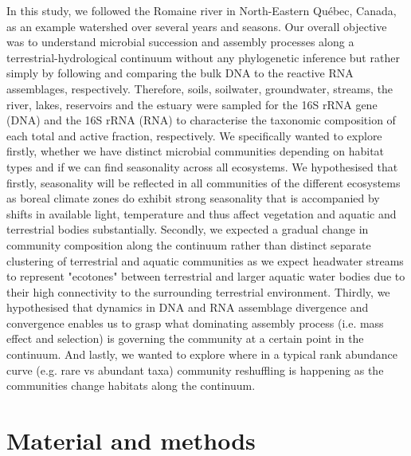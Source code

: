\documentclass[12pt,a4paper]{article} %
\begin{document}
In this study, we followed the Romaine river in North-Eastern Qu\'{e}bec, Canada, as an example watershed over several years and seasons. Our overall objective was to understand microbial succession and assembly processes along a terrestrial-hydrological continuum without any phylogenetic inference but rather simply by following and comparing the bulk DNA to the reactive RNA assemblages, respectively. Therefore, soils, soilwater, groundwater, streams, the river, lakes, reservoirs and the estuary were sampled for the 16S rRNA gene (DNA) and the 16S rRNA (RNA) to characterise the taxonomic composition of each total and active fraction, respectively. We specifically wanted to explore firstly, whether we have distinct microbial communities depending on habitat types and if we can find seasonality across all ecosystems. We hypothesised that firstly, seasonality will be reflected in all communities of the different ecosystems as boreal climate zones do exhibit strong seasonality that is accompanied by shifts in available light, temperature and thus affect vegetation and aquatic and terrestrial bodies substantially. Secondly, we expected a gradual change in community composition along the continuum rather than distinct separate clustering of terrestrial and aquatic communities as we expect headwater streams to represent "ecotones" between terrestrial and larger aquatic water bodies due to their high connectivity to the surrounding terrestrial environment. Thirdly, we hypothesised that dynamics in DNA and RNA assemblage divergence and convergence enables us to grasp what dominating assembly process (i.e. mass effect and selection) is governing the community at a certain point in the continuum. And lastly, we wanted to explore where in a typical rank abundance curve (e.g. rare vs abundant taxa) community reshuffling is happening as the communities change habitats along the continuum.

\section*{Material and methods}
\end{document}
